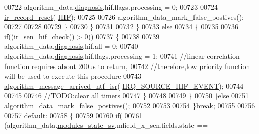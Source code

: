 \begin{DoxyCode}
{{{{{00722                                                     algorithm\_data.\hyperlink{a00016_a16f85d57ec98b4ad05f5a2e10536b3c6}{diagnosis}.hif.flags.processing 
      = 0;
00723 
00724                                                     \hyperlink{a00017_a1c9872e93491d95a24ab0bc723d39a74}{ir\_record\_reset}(
      \hyperlink{a00017_aaa1c1ffe30eff38b979b1af9d4e4ef19}{HIF});
00725 
00726                                                     algorithm\_data\_mark\_false\_postives();
00727 
00728 
00729                                                 \}
00730                                           \}
00731 
00732                                      \}
00733                                      \textcolor{keywordflow}{else}
00734                                      \{
00735 
00736                                                \textcolor{keywordflow}{if}((\hyperlink{a00017_a86870a0e00601a92277e689447739ce9}{ir\_sen\_hif\_check}() > 0))
00737                                                \{
00738 
00739                                                    algorithm\_data.\hyperlink{a00016_a16f85d57ec98b4ad05f5a2e10536b3c6}{diagnosis}.hif.all = 0;
00740                                                    algorithm\_data.\hyperlink{a00016_a16f85d57ec98b4ad05f5a2e10536b3c6}{diagnosis}.hif.flags.processing =
       1;
00741                                                        \textcolor{comment}{//linear correlation function requires about 200us
       to return,}
00742                                                        \textcolor{comment}{//therefore,low priority function will be used to
       execute this procedure}
00743                                                         
      \hyperlink{a00038_a85471d58eae93d5d7e7e2b52e2b915d3}{algorithm\_message\_arrived\_ntf\_isr}(
      \hyperlink{a00021_a51725fc3a4c26625f15db1274791d961}{IRQ\_SOURCE\_HIF\_EVENT});
00744 
00745 
00746                                                         \textcolor{comment}{//TODO:clear all timers}
00747                                                \}
00748 
00749                                     \}
00750                       \}\textcolor{keywordflow}{else}
00751                           algorithm\_data\_mark\_false\_postives();
00752 
00753 
00754                 \}\textcolor{keywordflow}{break};
00755 
00756 
00757                  \textcolor{keywordflow}{default}:
00758                 \{
00759 
00760                       \textcolor{keywordflow}{if}(
00761                         (algorithm\_data.\hyperlink{a00016_a293140e240bbd54f7601adbc9194148c}{modules\_state\_sv}.mfield\_x\_sen.fields.state == 
}}}}}
\end{DoxyCode}

